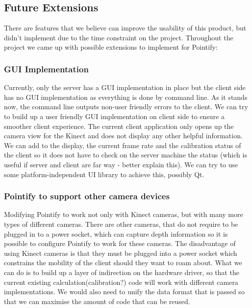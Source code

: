 \documentclass{article}
\begin{document}
\newpage
\subsection{Future Extensions}
There are features that we believe can improve the usability of this product, but didn't implement due to the time constraint on the project. Throughout the project we came up with possible extensions to implement for Pointify:
\subsubsection{GUI Implementation}
Currently, only the server has a GUI implementation in place but the client side has no GUI implementation as everything is done by command line. As it stands now, the command line outputs non-user friendly errors to the client. We can try to build up a user friendly GUI implementation on client side to ensure a smoother client experience. The current client application only opens up the camera view for the Kinect and does not display any other helpful information. We can add to the display, the current frame rate and the calibration status of the client so it does not have to check on the server machine the status (which is useful if server and client are far way - better explain this). We can try to use some platform-independent UI library to achieve this, possibly Qt.
\subsubsection{Pointify to support other camera devices}
Modifying Pointify to work not only with Kinect cameras, but with many more types of different cameras. There are other cameras, that do not require to be plugged in to a power socket, which can capture depth information so it is possible to configure Pointify to work for these cameras. The disadvantage of using Kinect cameras is that they must be plugged into a power socket which constrains the mobility of the client should they want to roam about. What we can do is to build up a layer of indirection on the hardware driver, so that the current existing calculation(calibration?) code will work with different camera implementations. We would also need to unify the data format that is passed so that we can maximise the amount of code that can be reused.
\end{document}
